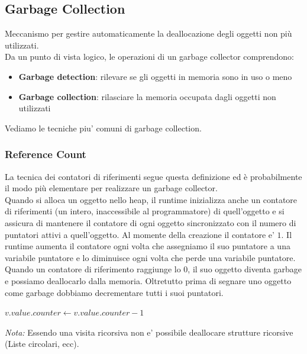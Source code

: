 \documentclass[a4paper,12pt]{article}
\begin{document}
\subsection{Garbage Collection}
Meccanismo per gestire automaticamente la deallocazione degli oggetti non più utilizzati.\\
Da un punto di vista logico, le operazioni di un garbage collector comprendono:
\begin{itemize}
  \item \textbf{Garbage detection}: rilevare se gli oggetti in memoria sono in uso o meno
  \item \textbf{Garbage collection}: rilasciare la memoria occupata dagli oggetti non utilizzati
\end{itemize}
Vediamo le tecniche piu' comuni di garbage collection.
\subsubsection{Reference Count}
La tecnica dei contatori di riferimenti segue questa definizione ed è probabilmente il modo più elementare per realizzare un garbage collector.\\
Quando si alloca un oggetto nello heap, il runtime inizializza anche un contatore di
riferimenti (un intero, inaccessibile al programmatore) di quell'oggetto e si
assicura di mantenere il contatore di ogni oggetto sincronizzato con il numero di
puntatori attivi a quell'oggetto. Al momente della creazione il contatore e' $1$. Il
runtime aumenta il contatore ogni volta che assegniamo il suo puntatore a una
variabile puntatore e lo diminuisce ogni volta che perde una variabile puntatore.\\
Quando un contatore di riferimento raggiunge lo 0, il suo oggetto diventa garbage e
possiamo deallocarlo dalla memoria. Oltretutto prima di segnare uno oggetto come garbage dobbiamo decrementare tutti i suoi puntatori.
\begin{algorithm}[H]
\caption{Release con reference counting}
\begin{algorithmic}
        \State \Return
    \EndIf

        \State \Return
    \EndIf

            \State $v.value.counter \gets v.value.counter - 1$
                \State {}
            \EndIf
        \EndIf
    \EndFor

    \State {}
\EndProcedure
\end{algorithmic}
\end{algorithm}
\textit{Nota:} Essendo una visita ricorsiva non e' possibile deallocare strutture ricorsive (Liste circolari, ecc).
\end{document}
